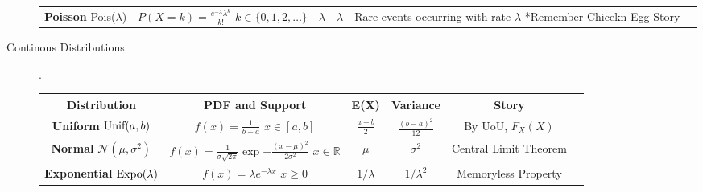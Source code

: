 \documentclass[11pt]{article}
\theoremstyle{definition}
\theoremstyle{remark}
\newcommand{\R}{\mathbb{R}}
\newcommand{\Unif}{\textnormal{Unif}}
\newcommand{\Norm}{\mathcal{N}}
\newcommand{\Expo}{\textnormal{Expo}}
\newcommand{\Pois}{\textnormal{Pois}}
\begin{document}
\begin{landscape}
\begin{description}
\begin{center}
\begin{tabular}{cccccc}
\hline
\shortstack{\textbf{Poisson} \\ \Pois($\lambda$)} & \shortstack{$P(X=k) = \frac{e^{-\lambda}\lambda^k}{k!}$ \\ $k \in \{0, 1, 2, \dots \}$} & $\lambda$ & $\lambda$ & \shortstack{Rare events occurring with rate $\lambda$ \\ *Remember Chicekn-Egg Story} \\
\end{tabular}
\end{center}

\item[Continous Distributions] .

\noindent \begin{center}
\begin{tabular}{cccccc}
\textbf{Distribution} & \textbf{PDF and Support} & \textbf{E(X)}  & \textbf{Variance}  &\textbf{Story}\\ \hline
\shortstack{\textbf{Uniform} \\ $\Unif(a, b)$} & \shortstack{$f(x) = \frac{1}{b-a}$ \\ $x \in [a, b]$} & $\frac{a+b}{2}$ & $\frac{(b-a)^2}{12}$ & By UoU, $F_X(X)$ \\ \hline
\shortstack{\textbf{Normal} \\ $\Norm(\mu, \sigma^2)$} & \shortstack{$f(x) = \frac{1}{\sigma \sqrt{2\pi}} \exp{-\frac{(x - \mu)^2}{2 \sigma^2}}$ \\ $x \in \R$} & $\mu$ & $\sigma^2$ & Central Limit Theorem \\ \hline
\shortstack{\textbf{Exponential} \\ $\Expo(\lambda)$} & \shortstack{$f(x) = \lambda e^{-\lambda x}$ \\ $x \geq 0$} & $1/\lambda$ & $1/\lambda^2$ & Memoryless Property \\ \hline
\end{tabular}
\end{center}

\end{description}
\end{landscape}
\end{document}
